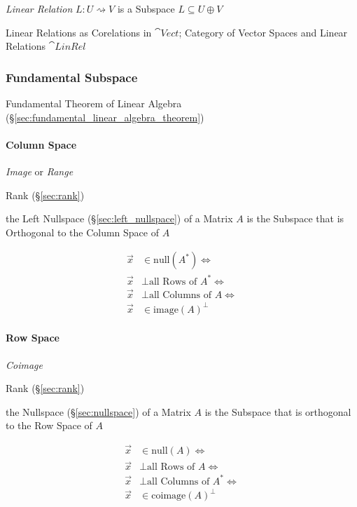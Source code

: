 \emph{Linear Relation} $L : U \rightsquigarrow V$ is a Subspace $L
\subseteq U \oplus V$

Linear Relations as Corelations in $\cat{Vect}$; Category of Vector
Spaces and Linear Relations $\cat{LinRel}$



\subsubsection{Fundamental Subspace}\label{sec:fundamental_subspace}

\fist Fundamental Theorem of Linear Algebra
(\S\ref{sec:fundamental_linear_algebra_theorem})



\paragraph{Column Space}\label{sec:column_space}\hfill

\emph{Image} or \emph{Range}

Rank (\S\ref{sec:rank})

the Left Nullspace (\S\ref{sec:left_nullspace}) of a Matrix $A$ is the Subspace
that is Orthogonal to the Column Space of $A$

\begin{align*}
  \vec{x} & \in \mathrm{null}(A^*) \Leftrightarrow         \\
  \vec{x} & \bot \text{all Rows of }A^* \Leftrightarrow    \\
  \vec{x} & \bot \text{all Columns of }A \Leftrightarrow   \\
  \vec{x} & \in \mathrm{image}(A)^\bot
\end{align*}



\paragraph{Row Space}\label{sec:row_space}\hfill

\emph{Coimage}

Rank (\S\ref{sec:rank})

the Nullspace (\S\ref{sec:nullspace}) of a Matrix $A$ is the Subspace that is
orthogonal to the Row Space of $A$

\begin{align*}
  \vec{x} & \in \mathrm{null}(A) \Leftrightarrow         \\
  \vec{x} & \bot \text{all Rows of }A \Leftrightarrow    \\
  \vec{x} & \bot \text{all Columns of }A^* \Leftrightarrow   \\
  \vec{x} & \in \mathrm{coimage}(A)^\bot
\end{align*}



